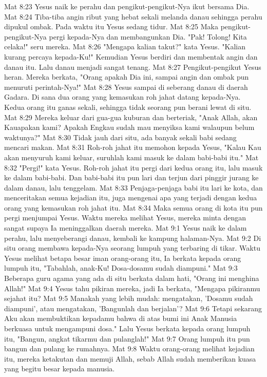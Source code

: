 Mat 8:23  Yesus naik ke perahu dan pengikut-pengikut-Nya ikut bersama Dia.
Mat 8:24  Tiba-tiba angin ribut yang hebat sekali melanda danau sehingga perahu dipukul ombak. Pada waktu itu Yesus sedang tidur.
Mat 8:25  Maka pengikut-pengikut-Nya pergi kepada-Nya dan membangunkan Dia. "Pak! Tolong! Kita celaka!" seru mereka.
Mat 8:26  "Mengapa kalian takut?" kata Yesus. "Kalian kurang percaya kepada-Ku!" Kemudian Yesus berdiri dan membentak angin dan danau itu. Lalu danau menjadi sangat tenang.
Mat 8:27  Pengikut-pengikut Yesus heran. Mereka berkata, "Orang apakah Dia ini, sampai angin dan ombak pun menuruti perintah-Nya!"
Mat 8:28  Yesus sampai di seberang danau di daerah Gadara. Di sana dua orang yang kemasukan roh jahat datang kepada-Nya. Kedua orang itu ganas sekali, sehingga tidak seorang pun berani lewat di situ.
Mat 8:29  Mereka keluar dari gua-gua kuburan dan berteriak, "Anak Allah, akan Kauapakan kami? Apakah Engkau sudah mau menyiksa kami walaupun belum waktunya?"
Mat 8:30  Tidak jauh dari situ, ada banyak sekali babi sedang mencari makan.
Mat 8:31  Roh-roh jahat itu memohon kepada Yesus, "Kalau Kau akan menyuruh kami keluar, suruhlah kami masuk ke dalam babi-babi itu."
Mat 8:32  "Pergi!" kata Yesus. Roh-roh jahat itu pergi dari kedua orang itu, lalu masuk ke dalam babi-babi. Dan babi-babi itu pun lari dan terjun dari pinggir jurang ke dalam danau, lalu tenggelam.
Mat 8:33  Penjaga-penjaga babi itu lari ke kota, dan menceritakan semua kejadian itu, juga mengenai apa yang terjadi dengan kedua orang yang kemasukan roh jahat itu.
Mat 8:34  Maka semua orang di kota itu pun pergi menjumpai Yesus. Waktu mereka melihat Yesus, mereka minta dengan sangat supaya Ia meninggalkan daerah mereka.
Mat 9:1  Yesus naik ke dalam perahu, lalu menyeberangi danau, kembali ke kampung halaman-Nya.
Mat 9:2  Di situ orang membawa kepada-Nya seorang lumpuh yang terbaring di tikar. Waktu Yesus melihat betapa besar iman orang-orang itu, Ia berkata kepada orang lumpuh itu, "Tabahlah, anak-Ku! Dosa-dosamu sudah diampuni."
Mat 9:3  Beberapa guru agama yang ada di situ berkata dalam hati, "Orang ini menghina Allah!"
Mat 9:4  Yesus tahu pikiran mereka, jadi Ia berkata, "Mengapa pikiranmu sejahat itu?
Mat 9:5  Manakah yang lebih mudah: mengatakan, 'Dosamu sudah diampuni', atau mengatakan, 'Bangunlah dan berjalan'?
Mat 9:6  Tetapi sekarang Aku akan membuktikan kepadamu bahwa di atas bumi ini Anak Manusia berkuasa untuk mengampuni dosa." Lalu Yesus berkata kepada orang lumpuh itu, "Bangun, angkat tikarmu dan pulanglah!"
Mat 9:7  Orang lumpuh itu pun bangun dan pulang ke rumahnya.
Mat 9:8  Waktu orang-orang melihat kejadian itu, mereka ketakutan dan memuji Allah, sebab Allah sudah memberikan kuasa yang begitu besar kepada manusia.
